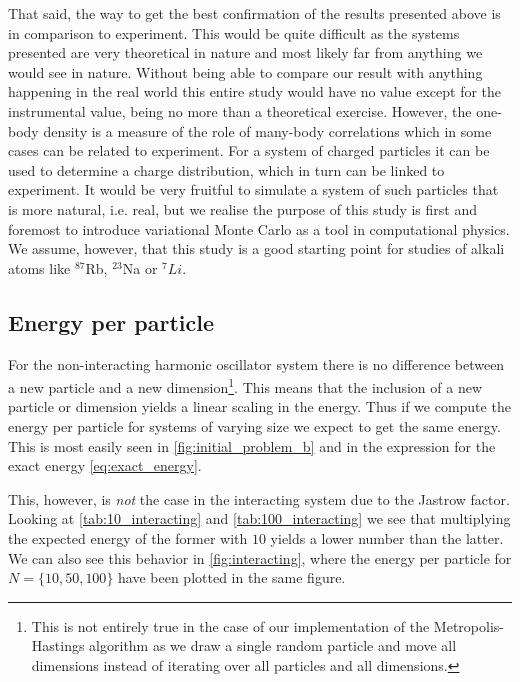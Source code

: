 \documentclass[
    a4paper, aps, twocolumn, floatfix, superscriptaddress,
    nofootinbib]{revtex4-1}
\newcommand{\1}{\mathds{1}}
\begin{document}
        That said, the way to get the best confirmation of the results presented
        above is in comparison to experiment. This would be quite difficult
        as the systems presented are very theoretical in nature and most likely
        far from anything we would see in nature. Without being able to compare
        our result with anything happening in the real world this entire study would
        have no value except for the instrumental value, being no more than
        a theoretical exercise.  However, the one-body
        density is a measure of the role of many-body correlations which in
        some cases can be related to experiment. For a system of charged
        particles it can be used to determine a charge distribution, which in
        turn can be linked to experiment. It would be very fruitful to simulate a
        system of such particles that is more natural, i.e. real, but we realise the
        purpose of this study is first and foremost to introduce variational
        Monte Carlo as a tool in computational physics. We assume, however, that
        this study is a good starting point for studies of alkali atoms like
        $^{87}$Rb, $^{23}$Na or $^7Li$.

    \subsection{Energy per particle}
        For the non-interacting harmonic oscillator system there is no
        difference between a new particle and a new dimension\footnote{This is
        not entirely true in the case of our implementation of the
        Metropolis-Hastings algorithm as we draw a single random particle and
        move all dimensions instead of iterating over all particles and all
        dimensions.}. This means that the inclusion of a new particle or
        dimension yields a linear scaling in the energy. Thus if we compute the
        energy per particle for systems of varying size we expect to get the
        same energy. This is most easily seen in \autoref{fig:initial_problem_b}
        and in the expression for the exact energy \autoref{eq:exact_energy}.

        This, however, is \emph{not} the case in the interacting system due to
        the Jastrow factor. Looking at \autoref{tab:10_interacting} and
        \autoref{tab:100_interacting} we see that multiplying the expected
        energy of the former with $10$ yields a lower number than the latter. We
        can also see this behavior in \autoref{fig:interacting}, where the
        energy per particle for $N = \{10, 50, 100\}$ have been plotted in the
        same figure.
\end{document}

